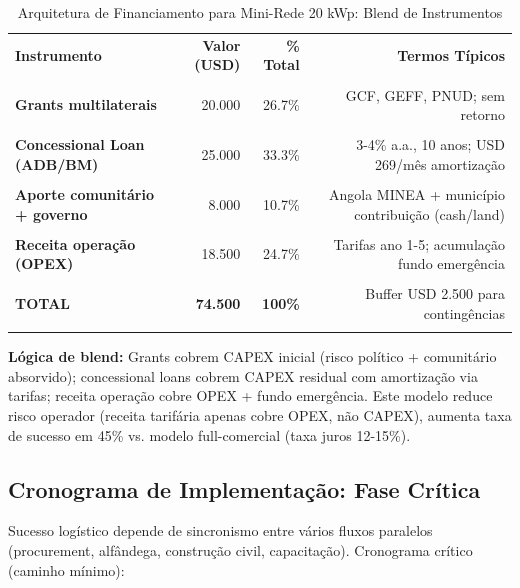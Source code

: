 \documentclass[12pt, a4paper]{article}
\begin{document}
\begin{table}[H]
\centering
\caption{Arquitetura de Financiamento para Mini-Rede 20 kWp: Blend de Instrumentos}
\label{tab:financing}
\small
\begin{tabular}{|l|r|r|r|}
\hline\textbf{Instrumento} &\textbf{Valor (USD)} &\textbf{\% Total} &\textbf{Termos Típicos} \\\\
\hline
\textbf{Grants multilaterais} & 20.000 & 26.7\% & GCF, GEFF, PNUD; sem retorno \\\\
\textbf{Concessional Loan (ADB/BM)} & 25.000 & 33.3\% & 3-4\% a.a., 10 anos; USD 269/mês amortização \\\\
\textbf{Aporte comunitário + governo} & 8.000 & 10.7\% & Angola MINEA + município contribuição (cash/land) \\\\
\textbf{Receita operação (OPEX)} & 18.500 & 24.7\% & Tarifas ano 1-5; acumulação fundo emergência \\\\
\hline\textbf{TOTAL} &\textbf{74.500} &\textbf{100\%} & Buffer USD 2.500 para contingências \\\\
\hline
\end{tabular}
\end{table}\textbf{Lógica de blend:} Grants cobrem CAPEX inicial (risco político + comunitário absorvido); concessional loans cobrem CAPEX residual com amortização via tarifas; receita operação cobre OPEX + fundo emergência. Este modelo reduce risco operador (receita tarifária apenas cobre OPEX, não CAPEX), aumenta taxa de sucesso em 45\% vs. modelo full-comercial (taxa juros 12-15\%).\

\subsection{Cronograma de Implementação: Fase Crítica}

Sucesso logístico depende de sincronismo entre vários fluxos paralelos (procurement, alfândega, construção civil, capacitação). Cronograma crítico (caminho mínimo):\
\end{document}
